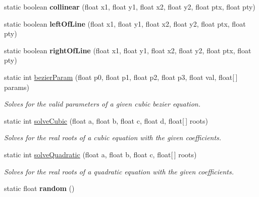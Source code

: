 \begin{DoxyCompactItemize}
\item 
\hypertarget{classhype_1_1util_1_1_h_math_aefc2b344f16a16f3ee4661db27e1c280}{static boolean {\bfseries collinear} (float x1, float y1, float x2, float y2, float ptx, float pty)}\label{classhype_1_1util_1_1_h_math_aefc2b344f16a16f3ee4661db27e1c280}

\item 
\hypertarget{classhype_1_1util_1_1_h_math_a1f06cdcb07fb30b543b7ac1cfbff615c}{static boolean {\bfseries left\-Of\-Line} (float x1, float y1, float x2, float y2, float ptx, float pty)}\label{classhype_1_1util_1_1_h_math_a1f06cdcb07fb30b543b7ac1cfbff615c}

\item 
\hypertarget{classhype_1_1util_1_1_h_math_aed97b073b226899b8c8750cf58a282ca}{static boolean {\bfseries right\-Of\-Line} (float x1, float y1, float x2, float y2, float ptx, float pty)}\label{classhype_1_1util_1_1_h_math_aed97b073b226899b8c8750cf58a282ca}

\item 
static int \hyperlink{classhype_1_1util_1_1_h_math_a7c43d0c4017e4b65c8f00788a0170bbc}{bezier\-Param} (float p0, float p1, float p2, float p3, float val, float\mbox{[}$\,$\mbox{]} params)
\begin{DoxyCompactList}\small\item\em Solves for the valid parameters of a given cubic bezier equation. \end{DoxyCompactList}\item 
static int \hyperlink{classhype_1_1util_1_1_h_math_a505f12b6206cede660900972055aae67}{solve\-Cubic} (float a, float b, float c, float d, float\mbox{[}$\,$\mbox{]} roots)
\begin{DoxyCompactList}\small\item\em Solves for the real roots of a cubic equation with the given coefficients. \end{DoxyCompactList}\item 
static int \hyperlink{classhype_1_1util_1_1_h_math_ab825adc4d94c5feef8c357d2720df28b}{solve\-Quadratic} (float a, float b, float c, float\mbox{[}$\,$\mbox{]} roots)
\begin{DoxyCompactList}\small\item\em Solves for the real roots of a quadratic equation with the given coefficients. \end{DoxyCompactList}\item 
\hypertarget{classhype_1_1util_1_1_h_math_a8cb35fab331a42c739c6c0e80aaf55ca}{static float {\bfseries random} ()}\label{classhype_1_1util_1_1_h_math_a8cb35fab331a42c739c6c0e80aaf55ca}


\end{DoxyCompactItemize}
